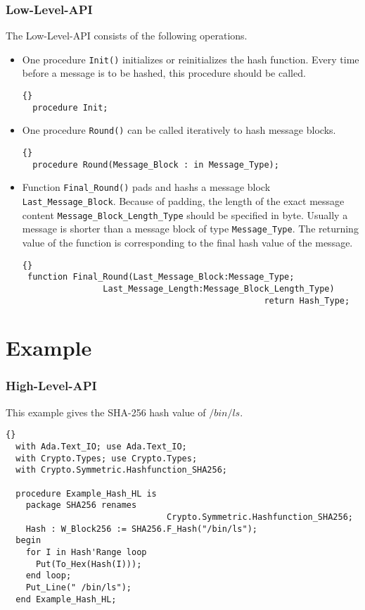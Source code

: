 \subsubsection*{Low-Level-API}
The Low-Level-API consists of the following operations.
\begin{itemize}
\item One procedure \texttt{Init()} initializes or reinitializes the
  hash function. Every time before a message is to be hashed, this
  procedure should be called.
\begin{lstlisting}{}
  procedure Init;
\end{lstlisting}
\item One procedure \texttt{Round()} can be called iteratively to hash
  message blocks.
\begin{lstlisting}{}
  procedure Round(Message_Block : in Message_Type);
\end{lstlisting}
\item Function \texttt{Final\_Round()} pads and hashs a message block
  \texttt{Last\_Message\_Block}. Because of padding, the length of the
  exact message content \texttt{Message\_Block\_Length\_Type} should
  be specified in byte. Usually a message is shorter than a message
  block of type \texttt{Message\_Type}. The returning value of the
  function is corresponding to the final hash value of the message.
\begin{lstlisting}{}
 function Final_Round(Last_Message_Block:Message_Type;
        	    Last_Message_Length:Message_Block_Length_Type)
        			 	  			 			return Hash_Type;
\end{lstlisting}
\end{itemize}


\section{Example}
\subsubsection*{High-Level-API}
This example gives the SHA-256 hash value of $/bin/ls$.
\begin{lstlisting}{}
  with Ada.Text_IO; use Ada.Text_IO;
  with Crypto.Types; use Crypto.Types;
  with Crypto.Symmetric.Hashfunction_SHA256;

  procedure Example_Hash_HL is
    package SHA256 renames
    							Crypto.Symmetric.Hashfunction_SHA256;
    Hash : W_Block256 := SHA256.F_Hash("/bin/ls");
  begin
    for I in Hash'Range loop
      Put(To_Hex(Hash(I)));
    end loop;
    Put_Line(" /bin/ls");
  end Example_Hash_HL;
\end{lstlisting}
